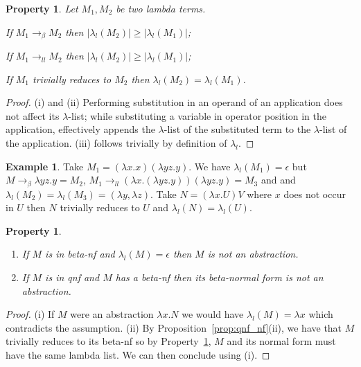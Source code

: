 \documentclass{elsarticle}
\theoremstyle{plain}
\newtheorem{property}[theorem]{Property}
\theoremstyle{definition}
\newtheorem{example}{Example}[section]
\newcommand{\llred}{\rightarrow_{ll}}
\begin{document}

\begin{property}
\label{property:lambdalist_linearred}
    Let $M_1, M_2$ be two lambda terms.
    \begin{enumerate*}[noitemsep,label=(\roman*)]
        \item If $M_1 \rightarrow_\beta M_2$ then $|\lambda_l(M_2)| \geq
        |\lambda_l(M_1)|$;
        \item If $M_1 \llred M_2$ then $|\lambda_l(M_2)| \geq
        |\lambda_l(M_1)|$;
        \item If $M_1$ trivially reduces to $M_2$ then $\lambda_l(M_2) =
        \lambda_l(M_1)$.
    \end{enumerate*}
\end{property}
\begin{proof}
    (i) and (ii) Performing substitution in an operand of an application does not affect its $\lambda$-list; while substituting a variable in operator position in the application, effectively appends the $\lambda$-list of the substituted term to the $\lambda$-list of the application.
    (iii) follows trivially by definition of $\lambda_l$.
\end{proof}
\begin{example}
Take $M_1 = (\lambda x . x) (\lambda y z . y)$. We have $\lambda_l(M_1) = \epsilon$ but $M \rightarrow_\beta \lambda y z . y = M_2$,
$M_1 \llred (\lambda x . (\lambda y z . y)) (\lambda y z . y) = M_3$ and
and $\lambda_l(M_2) = \lambda_l(M_3) = (\lambda y, \lambda z)$.
Take $N = (\lambda x . U) V$ where $x$ does not occur in $U$ then $N$ trivially reduces to $U$ and $\lambda_l(N) = \lambda_l(U)$.
\end{example}

\begin{property}
\label{prop:qnf_betanf_empty_lambdalist}
    \begin{enumerate}[noitemsep,label=(\roman*)]
    \item If $M$ is in beta-nf and $\lambda_l(M) = \epsilon$ then $M$ is not an abstraction.
    \item If $M$ is in \emph{qnf} and $M$ has a beta-nf then its beta-normal form is not an abstraction.
    \end{enumerate}
\end{property}
\begin{proof}
(i) If $M$ were an abstraction $\lambda x. N$ we would have $\lambda_l(M) = \lambda x$ which contradicts the assumption.
(ii) By Proposition~\ref{prop:qnf_nf}(ii), we have that $M$ trivially reduces to
its beta-nf so by Property~\ref{property:lambdalist_linearred},
$M$ and its normal form must have the same lambda list. We can then conclude using (i).
\end{proof}
\end{document}
